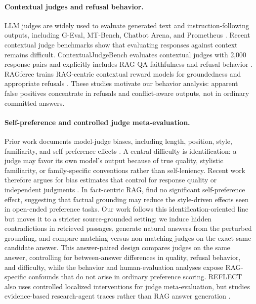 \paragraph{Contextual judges and refusal behavior.}
LLM judges are widely used to evaluate generated text and instruction-following outputs, including G-Eval, MT-Bench, Chatbot Arena, and Prometheus \citep{liu2023geval,zheng2023judging,kim2023prometheus}. Recent contextual judge benchmarks show that evaluating responses against context remains difficult. ContextualJudgeBench evaluates contextual judges with 2,000 response pairs and explicitly includes RAG-QA faithfulness and refusal behavior \citep{xu2025contextualjudgebench}. RAGferee trains RAG-centric contextual reward models for groundedness and appropriate refusals \citep{coman2025ragferee}. These studies motivate our behavior analysis: apparent false positives concentrate in refusals and conflict-aware outputs, not in ordinary committed answers.

\paragraph{Self-preference and controlled judge meta-evaluation.}
Prior work documents model-judge biases, including length, position, style, familiarity, and self-preference effects \citep{dubois2024length,shi2024position,liu2024narcissistic,wataoka2024selfpreference,ye2024justice}. A central difficulty is identification: a judge may favor its own model's output because of true quality, stylistic familiarity, or family-specific conventions rather than self-leniency. Recent work therefore argues for bias estimates that control for response quality or independent judgments \citep{spiliopoulou2025playfavorites,chen2025surface}. In fact-centric RAG, \citet{chen2025factrag} find no significant self-preference effect, suggesting that factual grounding may reduce the style-driven effects seen in open-ended preference tasks. Our work follows this identification-oriented line but moves it to a stricter source-grounded setting: we induce hidden contradictions in retrieved passages, generate natural answers from the perturbed grounding, and compare matching versus non-matching judges on the exact same candidate answer. This answer-paired design compares judges on the same answer, controlling for between-answer differences in quality, refusal behavior, and difficulty, while the behavior and human-evaluation analyses expose RAG-specific confounds that do not arise in ordinary preference scoring. REFLECT also uses controlled localized interventions for judge meta-evaluation, but studies evidence-based research-agent traces rather than RAG answer generation \citep{wang2026reflect}.

